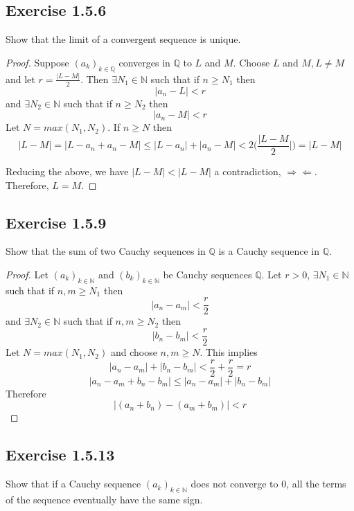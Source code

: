 \documentclass{tufte-book}
\theoremstyle{mytheoremstyle}
\theoremstyle{mylemstyle}
\theoremstyle{mydefstyle}
\begin{document}
\subsection{Exercise 1.5.6}
Show that the limit of a convergent sequence is unique.

\begin{proof}Suppose $(a_k)_{k \in \mathbb{Q}}$ converges in $\mathbb{Q}$ to $L$ and $M$. Choose $L$ and $M , L \neq M$ and let $r=\frac{|L-M|}{2}$. Then $\exists N_1 \in \mathbb{N}$ such that if $n \geq N_1$ 
then
\[|a_n-L|<r\]
and $\exists N_2 \in \mathbb{N}$ such that if $n \geq N_2$ then
\[|a_n-M|<r\]
Let $N=max(N_1,N_2)$. If $n \geq N$ then 
\[|L-M| = |L-a_n + a_n - M| \leq |L-a_n| + |a_n-M| < 2(\frac{|L-M}{2}|) = |L-M|\]

Reducing the above, we have $|L-M| < |L-M|$  a contradiction, $\Rightarrow \Leftarrow$.  Therefore, $L=M$.

\end{proof}

\subsection{Exercise 1.5.9}
Show that the sum of two Cauchy sequences in $\mathbb{Q}$ is a Cauchy sequence in $\mathbb{Q}$.

\begin{proof}Let $(a_k)_{k \in \mathbb{N}}$ and $(b_k)_{k \in \mathbb{N}}$ be Cauchy sequences $\mathbb{Q}$. Let $r>0$, $\exists N_1 \in \mathbb{N}$ such that if $n,m \geq N_1$ then 
\[|a_n - a_m| < \frac{r}{2}\]
and $\exists N_2 \in \mathbb{N}$ such that if $n,m \geq N_2$ then 
\[|b_n - b_m| < \frac{r}{2}\]
Let $N=max(N_1,N_2)$ and choose $n,m \geq N$. This implies
\[|a_n - a_m| + |b_n - b_m| < \frac{r}{2} + \frac{r}{2} = r\]
\[|a_n - a_m + b_n - b_m| \leq |a_n - a_m| + |b_n - b_m|\]
Therefore
\[|(a_n + b_n) - (a_m + b_m)| < r\]

\end{proof}

\subsection{Exercise 1.5.13}
Show that if a Cauchy sequence $(a_k)_{k  \in \mathbb{N}}$ does not converge to $0$, all the terms of the sequence eventually have the same sign.
\end{document}
